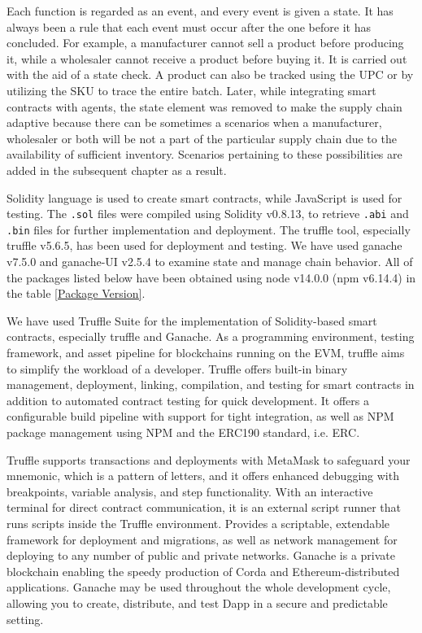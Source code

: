 \vspace{.5cm}

Each function is regarded as an event, and every event is given a state. It has always been a rule that each event must occur after the one before it has concluded. For example, a manufacturer cannot sell a product before producing it, while a wholesaler cannot receive a product before buying it. It is carried out with the aid of a state check. A product can also be tracked using the \ac{UPC} or by utilizing the \ac{SKU} to trace the entire batch. Later, while integrating smart contracts with agents, the state element was removed to make the supply chain adaptive because there can be sometimes a scenarios when a manufacturer, wholesaler or both will be not a part of the particular supply chain due to the availability of sufficient inventory. Scenarios pertaining to these possibilities are added in the subsequent chapter as a result.

\vspace{.5cm}

Solidity language is used to create smart contracts, while JavaScript is used for testing. The \texttt{.sol} files were compiled using Solidity v0.8.13, to retrieve \texttt{.abi} and \texttt{.bin} files for further implementation and deployment. The truffle tool, especially truffle v5.6.5, has been used for deployment and testing. We have used ganache v7.5.0 and ganache-UI v2.5.4 to examine state and manage chain behavior. All of the packages listed below have been obtained using node v14.0.0 (npm v6.14.4) in the table \ref{Package Version}.

We have used Truffle Suite for the implementation of Solidity-based smart contracts, especially truffle and Ganache. As a programming environment, testing framework, and asset pipeline for blockchains running on the \ac{EVM}, truffle aims to simplify the workload of a developer. Truffle offers built-in binary management, deployment, linking, compilation, and testing for smart contracts in addition to automated contract testing for quick development. It offers a configurable build pipeline with support for tight integration, as well as NPM package management using \ac{NPM} and the ERC190 standard, i.e. \ac{ERC}.

\vspace{.5cm}

Truffle supports transactions and deployments with MetaMask to safeguard your mnemonic, which is a pattern of letters, and it offers enhanced debugging with breakpoints, variable analysis, and step functionality.
With an interactive terminal for direct contract communication, it is an external script runner that runs scripts inside the Truffle environment. Provides a scriptable, extendable framework for deployment and migrations, as well as network management for deploying to any number of public and private networks. Ganache is a private blockchain enabling the speedy production of Corda and Ethereum-distributed applications. Ganache may be used throughout the whole development cycle, allowing you to create, distribute, and test \ac{Dapp} in a secure and predictable setting.


